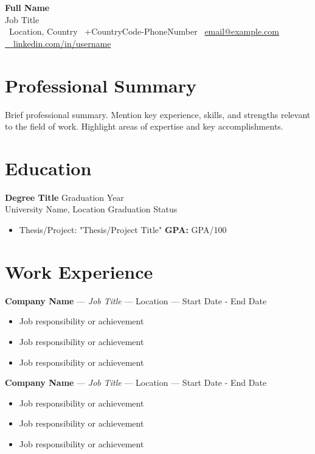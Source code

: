 \documentclass[11pt,a4paper]{article}
\newcommand{\role}[4]{
    \noindent\textbf{#1} — \textit{#2} — #3 — #4\\
}
\begin{document}
\begin{center} %
    {\Huge\textbf{Full Name}}\\[0.3em]
    {\Large\textcolor{mainblue}{Job Title}}\\[0.3em]
    \faMapMarker* \ Location, Country
    \faPhone* \ +CountryCode-PhoneNumber
    \faEnvelope \ \href{mailto:email@example.com}{email@example.com \ \faLinkedin \ \href{https://linkedin.com/in/username}{linkedin.com/in/username}}
\end{center}

\section*{Professional Summary}
\vspace{-0.8em}
Brief professional summary. Mention key experience, skills, and strengths relevant to the field of work. Highlight areas of expertise and key accomplishments.

\section*{Education}
\vspace{-0.8em}
\textbf{Degree Title} \hfill Graduation Year\\
University Name, Location \hfill Graduation Status
\begin{itemize}[leftmargin=*, nosep]
    \item Thesis/Project: "Thesis/Project Title" \hfill \textbf{GPA:} GPA/100
\end{itemize}

\section*{Work Experience}
\vspace{-0.6em}
\role{Company Name}{Job Title}{Location}{Start Date - End Date}
\vspace{-0.8em}
\begin{itemize}[leftmargin=*, nosep]
    \item Job responsibility or achievement
    \item Job responsibility or achievement
    \item Job responsibility or achievement
\end{itemize}

\vspace{0.3em}
\role{Company Name}{Job Title}{Location}{Start Date - End Date}
\vspace{-0.8em}
\begin{itemize}[leftmargin=*, nosep]
    \item Job responsibility or achievement
    \item Job responsibility or achievement
    \item Job responsibility or achievement
\end{itemize}
\end{document}
